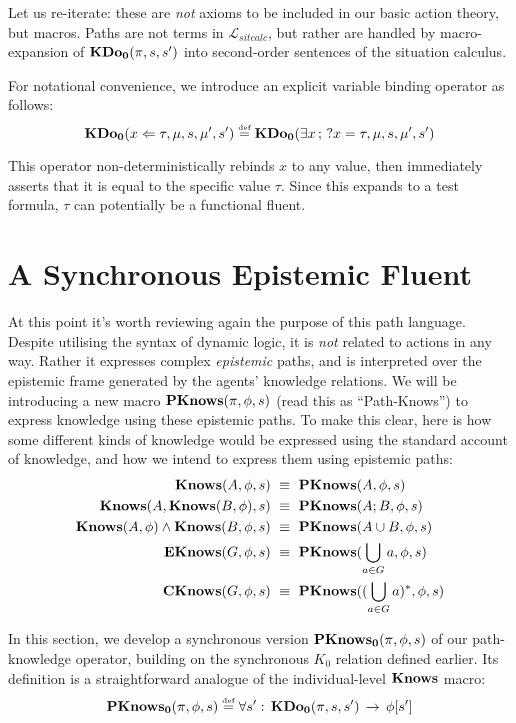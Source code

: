 Let us re-iterate: these are \emph{not} axioms to be included in our
basic action theory, but macros. Paths are not terms in $\mathcal{L}_{sitcalc}$,
but rather are handled by macro-expansion of $\mathbf{KDo_{0}}(\pi,s,s')$ into
second-order sentences of the situation calculus.

For notational convenience, we introduce an explicit variable binding
operator as follows:\[
\mathbf{KDo_{0}}(x\Leftarrow\tau,\mu,s,\mu',s')\stackrel{\mbox{\tiny def}}{=}\mathbf{KDo_{0}}(\exists x\,;\,?x=\tau,\mu,s,\mu',s')\]


This operator non-deterministically rebinds $x$ to any value, then
immediately asserts that it is equal to the specific value $\tau$.
Since this expands to a test formula, $\tau$ can potentially be a
functional fluent.


\section{A Synchronous Epistemic Fluent\label{sub:Synchronous-Epistemic-Fluent}}

At this point it's worth reviewing again the purpose of this path
language. Despite utilising the syntax of dynamic logic, it is \emph{not}
related to actions in any way. Rather it expresses complex \emph{epistemic}
paths, and is interpreted over the epistemic frame generated by the
agents' knowledge relations. We will be introducing a new macro $\mathbf{PKnows}(\pi,\phi,s)$
(read this as {}``Path-Knows'') to express knowledge using these
epistemic paths. To make this clear, here is how some different kinds
of knowledge would be expressed using the standard account of knowledge,
and how we intend to express them using epistemic paths:\begin{align}
\mathbf{Knows}(A,\phi,s) & \,\,\equiv\,\,\mathbf{PKnows}(A,\phi,s)\nonumber \\
\mathbf{Knows}(A,\mathbf{Knows}(B,\phi),s) & \,\,\equiv\,\,\mathbf{PKnows}(A;B,\phi,s)\nonumber \\
\mathbf{Knows}(A,\phi)\wedge\mathbf{Knows}(B,\phi,s) & \,\,\equiv\,\,\mathbf{PKnows}(A\cup B,\phi,s)\nonumber \\
\mathbf{EKnows}(G,\phi,s) & \,\,\equiv\,\,\mathbf{PKnows}(\bigcup_{a\in G}a,\phi,s)\nonumber \\
\mathbf{CKnows}(G,\phi,s) & \,\,\equiv\,\,\mathbf{PKnows}((\bigcup_{a\in G}a)^{*},\phi,s)\label{eq:pknows_identities}\end{align}


In this section, we develop a synchronous version $\mathbf{PKnows_{0}}(\pi,\phi,s)$
of our path-knowledge operator, building on the synchronous $K_{0}$
relation defined earlier. Its definition is a straightforward analogue
of the individual-level $\mathbf{Knows}$ macro:\[
\mathbf{PKnows_{0}}(\pi,\phi,s)\stackrel{\mbox{\tiny def}}{=}\forall s':\,\mathbf{KDo_{0}}(\pi,s,s')\,\rightarrow\,\phi[s']\]


